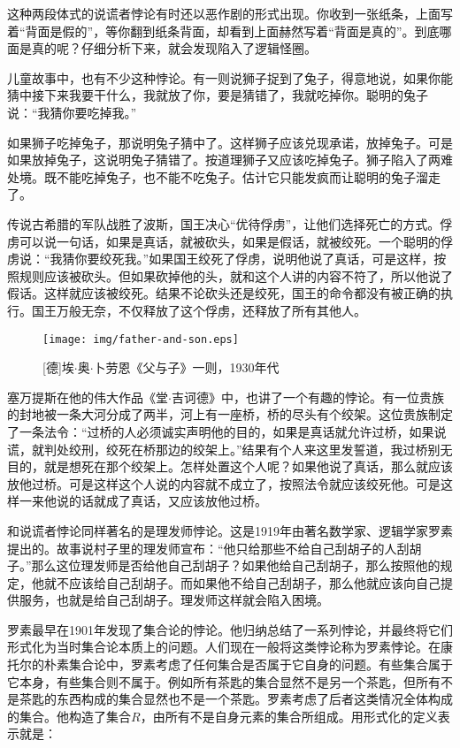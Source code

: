 \documentclass{article}
\begin{document}
这种两段体式的说谎者悖论有时还以恶作剧的形式出现。你收到一张纸条，上面写着“背面是假的”，等你翻到纸条背面，却看到上面赫然写着“背面是真的”。到底哪面是真的呢？仔细分析下来，就会发现陷入了逻辑怪圈。

儿童故事中，也有不少这种悖论。有一则说狮子捉到了兔子，得意地说，如果你能猜中接下来我要干什么，我就放了你，要是猜错了，我就吃掉你。聪明的兔子说：“我猜你要吃掉我。”

如果狮子吃掉兔子，那说明兔子猜中了。这样狮子应该兑现承诺，放掉兔子。可是如果放掉兔子，这说明兔子猜错了。按道理狮子又应该吃掉兔子。狮子陷入了两难处境。既不能吃掉兔子，也不能不吃兔子。估计它只能发疯而让聪明的兔子溜走了。

传说古希腊的军队战胜了波斯，国王决心“优待俘虏”，让他们选择死亡的方式。俘虏可以说一句话，如果是真话，就被砍头，如果是假话，就被绞死。一个聪明的俘虏说：“我猜你要绞死我。”如果国王绞死了俘虏，说明他说了真话，可是这样，按照规则应该被砍头。但如果砍掉他的头，就和这个人讲的内容不符了，所以他说了假话。这样就应该被绞死。结果不论砍头还是绞死，国王的命令都没有被正确的执行。国王万般无奈，不仅释放了这个俘虏，还释放了所有其他人。

\begin{wrapfigure}{L}{0.5\textwidth}
 \centering
 \texttt{[image: img/father-and-son.eps]}
 \captionsetup{labelformat=empty}
 \caption{[德]埃$\cdot$奥$\cdot$卜劳恩《父与子》一则，1930年代}
 \label{fig:father-and-son}
\end{wrapfigure}

塞万提斯在他的伟大作品《堂$\cdot$吉诃德》中，也讲了一个有趣的悖论。有一位贵族的封地被一条大河分成了两半，河上有一座桥，桥的尽头有个绞架。这位贵族制定了一条法令：“过桥的人必须诚实声明他的目的，如果是真话就允许过桥，如果说谎，就判处绞刑，绞死在桥那边的绞架上。”结果有个人来这里发誓道，我过桥别无目的，就是想死在那个绞架上。怎样处置这个人呢？如果他说了真话，那么就应该放他过桥。可是这样这个人说的内容就不成立了，按照法令就应该绞死他。可是这样一来他说的话就成了真话，又应该放他过桥。

和说谎者悖论同样著名的是理发师悖论。这是1919年由著名数学家、逻辑学家罗素提出的。故事说村子里的理发师宣布：“他只给那些不给自己刮胡子的人刮胡子。”那么这位理发师是否给他自己刮胡子？如果他给自己刮胡子，那么按照他的规定，他就不应该给自己刮胡子。而如果他不给自己刮胡子，那么他就应该向自己提供服务，也就是给自己刮胡子。理发师这样就会陷入困境。

罗素最早在1901年发现了集合论的悖论。他归纳总结了一系列悖论，并最终将它们形式化为当时集合论本质上的问题。人们现在一般将这类悖论称为罗素悖论。在康托尔的朴素集合论中，罗素考虑了任何集合是否属于它自身的问题。有些集合属于它本身，有些集合则不属于。例如所有茶匙的集合显然不是另一个茶匙，但所有不是茶匙的东西构成的集合显然也不是一个茶匙。罗素考虑了后者这类情况全体构成的集合。他构造了集合$R$，由所有不是自身元素的集合所组成。用形式化的定义表示就是：
\end{document}
